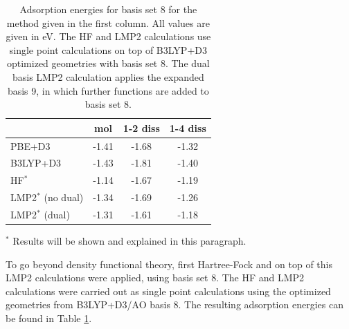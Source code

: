 \documentclass[11pt,DIV=13,BCOR=5mm,a4paper,headinclude]{scrbook}
\begin{document}
\begin{table}[!h]
  \centering
   \caption{Adsorption energies for basis set 8 for the method given in the first column.
All values are given in eV. The HF and LMP2 calculations use single point calculations on top of B3LYP+D3 optimized geometries with basis set 8.
The dual basis LMP2 calculation applies the expanded basis 9, in which further functions are added to basis set 8.}
  \begin{tabular}{l|ccc}
  \toprule
   &mol & 1-2 diss & 1-4 diss \\\midrule
PBE+D3 & -1.41 & -1.68 & -1.32 \\
B3LYP+D3 & -1.43 & -1.81 & -1.40 \\\midrule
HF$^\ast$ &-1.14 & -1.67 & -1.19\\
LMP2$^\ast$ (no dual) & -1.34 & -1.69 & -1.26\\
LMP2$^\ast$ (dual) & -1.31 & -1.61 & -1.18 \\ %
\bottomrule
  \end{tabular}
  \begin{tablenotes}
 \footnotesize
\item[] $^\ast$ Results will be shown and explained in this paragraph.
  \end{tablenotes}
  \label{tab:combined_results}
\end{table}

% 
% 

To go beyond density functional theory, first Hartree-Fock and on top of this LMP2 calculations were applied, using basis set 8.
The HF and LMP2 calculations were carried out as single point calculations using the optimized geometries from B3LYP+D3/AO basis 8.
The resulting adsorption energies can be found in Table \ref{tab:combined_results}. %
\end{document}
